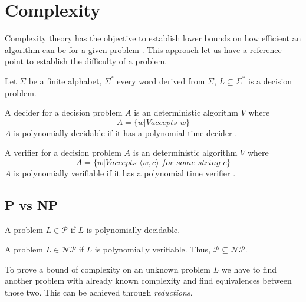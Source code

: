 \section{Complexity}
\label{sec:complex}

Complexity theory has the objective to establish lower bounds on how efficient
an algorithm can be for a given problem \cite{sipser2006}. This approach let us
have a reference point to establish the difficulty of a problem.


\begin{defn}
Let $\Sigma$ be a finite alphabet, $\Sigma^*$ every word derived from $\Sigma$, $L \subseteq \Sigma^*$ is a decision problem.
\end{defn}

\begin{defn}
  A decider for a decision problem $A$ is an deterministic algorithm $V$ where
    $$A = \{w | V \textit{accepts } w\}$$
  $A$ is polynomially decidable if it has a polynomial time decider \cite{sipser2006}.
\end{defn}

\begin{defn}
A verifier for a decision problem $A$ is an deterministic algorithm $V$ where
  $$A = \{w | V \textit{accepts } \langle w,c\rangle \textit{ for some string } c\}$$
$A$ is polynomially verifiable if it has a polynomial time verifier \cite{sipser2006}.
\end{defn}

\subsection{P vs NP}

\begin{defn}
A problem $L \in \mathcal{P}$ if $L$ is polynomially decidable.
\end{defn}

\begin{defn}
A problem $L \in \mathcal{NP}$ if $L$ is polynomially verifiable. Thus, $\mathcal{P} \subseteq \mathcal{NP}$.
\end{defn}

To prove a bound of complexity on an unknown problem $L$ we have to find another
problem with already known complexity and find equivalences between those two. This
can be achieved through \textit{reductions}.

